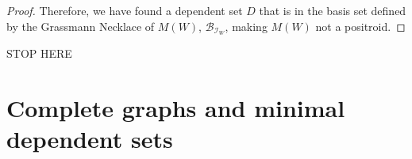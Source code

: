 \documentclass[11pt]{article}
\newcommand{\rk}{\textrm{rk }}
\newcommand{\cI}{\mathcal{I}}
\newcommand{\cB}{\mathcal{B}}
\theoremstyle{remark}
\theoremstyle{definition}
\begin{document}
\begin{proof}
Therefore, we have found a dependent set $D$ that is in the basis set defined by the Grassmann Necklace of $M(W)$, $\cB_{\cI_W}$, making $M(W)$ not a positroid. 






\end{proof}




STOP HERE

\section{Complete graphs and minimal dependent sets} 
\end{document}
